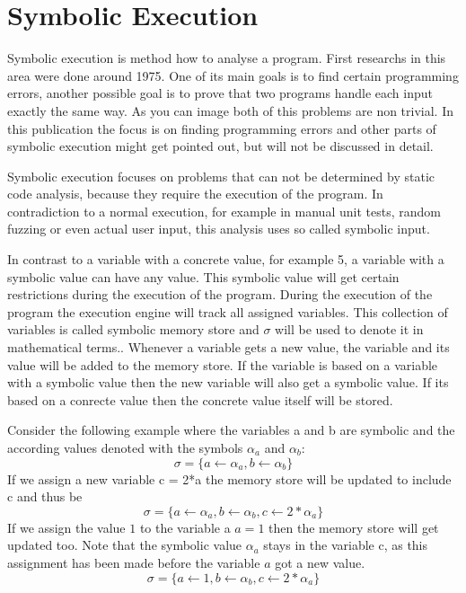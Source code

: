 \section{Symbolic Execution}\label{section:symbolic_execution}
Symbolic execution is method how to analyse a program. First researchs in this area were done around 1975. One of its main goals is to find certain programming errors, another possible goal is to prove that two programs handle each input exactly the same way. As you can image both of this problems are non trivial. In this publication the focus is on finding programming errors and other parts of symbolic execution might get pointed out, but will not be discussed in detail. 

Symbolic execution focuses on problems that can not be determined by static code analysis, because they require the execution of the program. In contradiction to a normal execution, for example in manual unit tests, random fuzzing or even actual user input, this analysis uses so called symbolic input.

In contrast to a variable with a concrete value, for example 5, a variable with a symbolic value can have any value. This symbolic value will get certain restrictions during the execution of the program. During the execution of the program the execution engine will track all assigned variables. This collection of variables is called symbolic memory store and $\sigma$ will be used to denote it in mathematical terms.\cite{SurveySymExec-CSUR18}.
Whenever a variable gets a new value, the variable and its value will be added to the memory store. If the variable is based on a variable with a symbolic value then the new variable will also get a symbolic value. If its based on a conrecte value then the concrete value itself will be stored.

Consider the following example where the variables a and b are symbolic and the according values denoted with the symbols $\alpha_a$ and $\alpha_b$:
$$\sigma = \{a\gets \alpha_a , b \gets \alpha_b\}$$
If we assign a new variable c = 2*a the memory store will be updated to include c and thus be
$$\sigma = \{a\gets \alpha_a , b \gets \alpha_b, c \gets 2*\alpha_a\}$$
If we assign the value $1$ to the variable a $a = 1$ then the memory store will get updated too. Note that the symbolic value $\alpha_a$ stays in the variable c, as this assignment has been made before the variable $a$ got a new value.
$$\sigma = \{a\gets 1, b \gets \alpha_b, c \gets 2*\alpha_a\}$$


